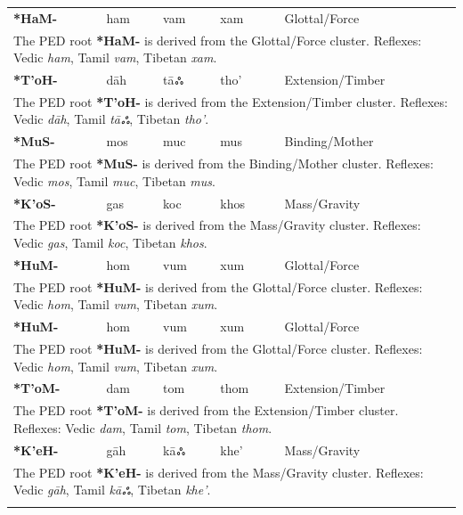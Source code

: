 \begin{longtable}{p{} p{} p{} p{} p{}}
\textbf{*HaM-} & ham & vam & xam & Glottal/Force \\ 
\multicolumn{5}{p{\textwidth}}{\small The PED root \textbf{*HaM-} is derived from the Glottal/Force cluster. Reflexes: Vedic \textit{ham}, Tamil \textit{vam}, Tibetan \textit{xam}. } \\ \addlinespace 
\textbf{*T'oH-} & dāh & tāஃ & tho' & Extension/Timber \\ 
\multicolumn{5}{p{\textwidth}}{\small The PED root \textbf{*T'oH-} is derived from the Extension/Timber cluster. Reflexes: Vedic \textit{dāh}, Tamil \textit{tāஃ}, Tibetan \textit{tho'}. } \\ \addlinespace 
\textbf{*MuS-} & mos & muc & mus & Binding/Mother \\ 
\multicolumn{5}{p{\textwidth}}{\small The PED root \textbf{*MuS-} is derived from the Binding/Mother cluster. Reflexes: Vedic \textit{mos}, Tamil \textit{muc}, Tibetan \textit{mus}. } \\ \addlinespace 
\textbf{*K'oS-} & gas & koc & khos & Mass/Gravity \\ 
\multicolumn{5}{p{\textwidth}}{\small The PED root \textbf{*K'oS-} is derived from the Mass/Gravity cluster. Reflexes: Vedic \textit{gas}, Tamil \textit{koc}, Tibetan \textit{khos}. } \\ \addlinespace 
\textbf{*HuM-} & hom & vum & xum & Glottal/Force \\ 
\multicolumn{5}{p{\textwidth}}{\small The PED root \textbf{*HuM-} is derived from the Glottal/Force cluster. Reflexes: Vedic \textit{hom}, Tamil \textit{vum}, Tibetan \textit{xum}. } \\ \addlinespace 
\textbf{*HuM-} & hom & vum & xum & Glottal/Force \\ 
\multicolumn{5}{p{\textwidth}}{\small The PED root \textbf{*HuM-} is derived from the Glottal/Force cluster. Reflexes: Vedic \textit{hom}, Tamil \textit{vum}, Tibetan \textit{xum}. } \\ \addlinespace 
\textbf{*T'oM-} & dam & tom & thom & Extension/Timber \\ 
\multicolumn{5}{p{\textwidth}}{\small The PED root \textbf{*T'oM-} is derived from the Extension/Timber cluster. Reflexes: Vedic \textit{dam}, Tamil \textit{tom}, Tibetan \textit{thom}. } \\ \addlinespace 
\textbf{*K'eH-} & gāh & kāஃ & khe' & Mass/Gravity \\ 
\multicolumn{5}{p{\textwidth}}{\small The PED root \textbf{*K'eH-} is derived from the Mass/Gravity cluster. Reflexes: Vedic \textit{gāh}, Tamil \textit{kāஃ}, Tibetan \textit{khe'}. } \\ \addlinespace 

\end{longtable}
